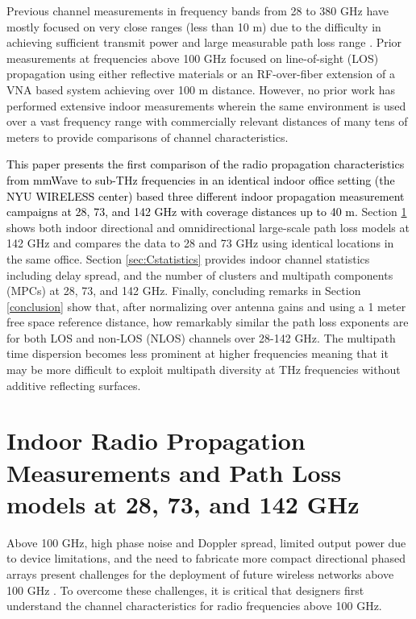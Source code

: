 \documentclass[conference]{IEEEtran}
\begin{document}
Previous channel measurements in frequency bands from 28 to 380 GHz \cite{pometcu18EuCAP,jacob09EUCAP,guan19TVT} have mostly focused on very close ranges (less than 10 m) due to the difficulty in achieving sufficient transmit power and large measurable path loss range \cite{rappaport19access}. Prior measurements at frequencies above 100 GHz \cite{ma18channel,abbasi20ICC,nguyen2018comparing} focused on line-of-sight (LOS) propagation using either reflective materials \cite{ma18channel} or an RF-over-fiber extension \cite{abbasi20ICC,nguyen2018comparing} of a VNA based system achieving over 100 m distance. However, no prior work has performed extensive indoor measurements wherein the same environment is used over a vast frequency range with commercially relevant distances of many tens of meters to provide comparisons of channel characteristics. 

\textcolor{black}{This paper presents the first comparison of the radio propagation characteristics from mmWave to sub-THz frequencies in an identical indoor office setting (the NYU WIRELESS center) based three different indoor propagation measurement campaigns at 28, 73, and 142 GHz with coverage distances up to 40 m.} Section \ref{sec:140PL} shows both indoor directional and omnidirectional large-scale path loss models at 142 GHz and compares the data to 28 and 73 GHz using identical locations in the same office. Section \ref{sec:Cstatistics} provides indoor channel statistics including delay spread, and the number of clusters and multipath components (MPCs) at 28, 73, and 142 GHz. Finally, concluding remarks in Section \ref{conclusion} show that, after normalizing over antenna gains and using a 1 meter free space reference distance, how remarkably similar the path loss exponents are for both LOS and non-LOS (NLOS) channels over 28-142 GHz. The multipath time dispersion becomes less prominent at higher frequencies meaning that it may be more difficult to exploit multipath diversity at THz frequencies without additive reflecting surfaces.

\section{Indoor Radio Propagation Measurements and Path Loss models at 28, 73, and 142 GHz}\label{sec:140PL}

Above 100 GHz, high phase noise and Doppler spread, limited output power due to device limitations, and the need to fabricate more compact directional phased arrays present challenges for the deployment of future wireless networks above 100 GHz \cite{rappaport19access,ma18channel,viswanathan20A, ghosh195g}. To overcome these challenges, it is critical that designers first understand the channel characteristics for radio frequencies above 100 GHz. 
\end{document}
